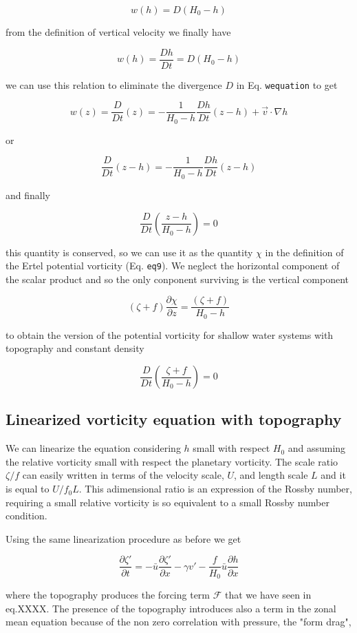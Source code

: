 \[w(h)= D (H_0-h)\]

from the definition of vertical velocity we finally have

\[w(h) =\frac{D h}{Dt}= D (H_0-h)\]

we can use this relation to eliminate the divergence \(D\) in Eq.
\texttt{wequation} to get

\[w(z)=\frac{D }{Dt}(z) =  - \frac{1}{H_0-h}\frac{D h}{Dt}(z-h)+\vec{v}\cdot\nabla h\]

or

{\[\frac{D }{Dt}(z-h) =  - \frac{1}{H_0-h}\frac{D h}{Dt}(z-h)\]}

and finally

{\[\frac{D }{Dt}\left(\frac{z-h}{H_0-h}\right) =  0\]}

this quantity is conserved, so we can use it as the quantity \(\chi\) in
the definition of the Ertel potential vorticity (Eq. \texttt{eq9}). We
neglect the horizontal component of the scalar product and so the only
conponent surviving is the vertical component

\[(\zeta+f) \frac{\partial \chi}{\partial z} = \frac{(\zeta + f)}{H_0-h}\]

to obtain the version of the potential vorticity for shallow water
systems with topography and constant density

{\[\frac{D }{Dt}\left(\frac{\zeta + f}{H_0-h}\right) =  0\]}

\subsection{Linearized vorticity equation with
topography}\label{linearized-vorticity-equation-with-topography}

We can linearize the equation considering \(h\) small with respect
\(H_0\) and assuming the relative vorticity small with respect the
planetary vorticity. The scale ratio \(\zeta/f\) can easily written in
terms of the velocity scale, \(U\), and length scale \(L\) and it is
equal to \(U/f_0L\). This adimensional ratio is an expression of the
Rossby number, requiring a small relative vorticity is so equivalent to
a small Rossby number condition.

Using the same linearization procedure as before we get

{\[\frac{\partial \zeta'}{\partial t}= -\bar{u}\frac{\partial \zeta'}{\partial x}-\gamma v'-\frac{f}{H_0}\bar{u}\frac{\partial h}{\partial x}\]}

where the topography produces the forcing term \(\mathcal{F}\) that we
have seen in eq.XXXX. The presence of the topography introduces also a
term in the zonal mean equation because of the non zero correlation with
pressure, the "form drag",

